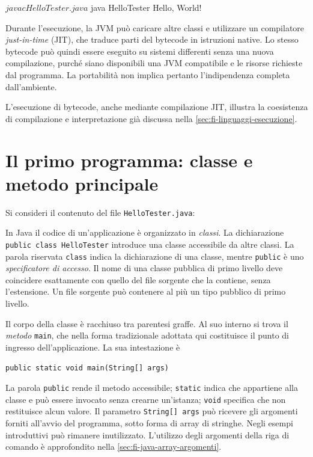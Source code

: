\begin{unipdterminal}
$ javac HelloTester.java
$ java HelloTester
Hello, World!
\end{unipdterminal}

Durante l'esecuzione, la JVM può caricare altre classi e
utilizzare un compilatore \emph{just-in-time} (JIT), che traduce
parti del bytecode in istruzioni native. Lo stesso bytecode
può quindi essere eseguito su sistemi differenti senza una
nuova compilazione, purché siano disponibili una JVM compatibile
e le risorse richieste dal programma. La portabilità non
implica pertanto l'indipendenza completa dall'ambiente.

L'esecuzione di bytecode, anche mediante compilazione JIT,
illustra la coesistenza di compilazione e interpretazione già
discussa nella \cref{sec:fi-linguaggi-esecuzione}.

\clearpage

\section{Il primo programma: classe e metodo principale}
\label{sec:fi-java-primo-programma}

Si consideri il contenuto del file \texttt{HelloTester.java}:



In Java il codice di un'applicazione è organizzato in \emph{classi}.
La dichiarazione \texttt{public class HelloTester} introduce una
classe accessibile da altre classi. La parola riservata \texttt{class}
indica la dichiarazione di una classe, mentre \texttt{public} è uno
\emph{specificatore di accesso}. Il nome di una classe pubblica
di primo livello deve coincidere esattamente con quello del file
sorgente che la contiene, senza l'estensione. Un file sorgente
può contenere al più un tipo pubblico di primo livello.

Il corpo della classe è racchiuso tra parentesi graffe. Al suo
interno si trova il \emph{metodo} \texttt{main}, che nella forma
tradizionale adottata qui costituisce il punto di ingresso
dell'applicazione. La sua intestazione è
\begin{center}
  \texttt{public static void main(String[] args)}
\end{center}
La parola \texttt{public} rende il metodo accessibile;
\texttt{static} indica che appartiene alla classe e può essere
invocato senza crearne un'istanza; \texttt{void} specifica che
non restituisce alcun valore. Il parametro \texttt{String[] args}
può ricevere gli argomenti forniti all'avvio del programma,
sotto forma di array di stringhe. Negli esempi introduttivi
può rimanere inutilizzato.
L'utilizzo degli argomenti della riga di comando è approfondito
nella \cref{sec:fi-java-array-argomenti}.

